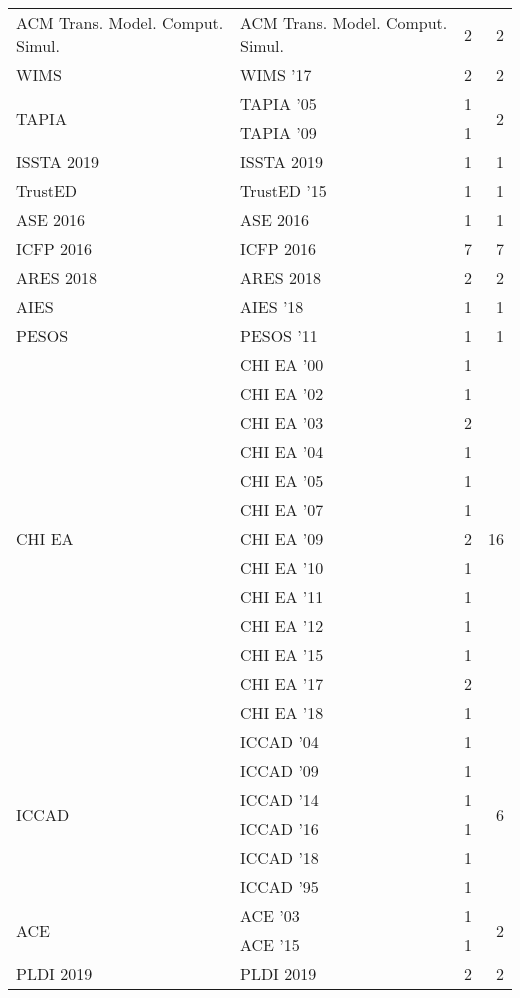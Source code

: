 \begin{table*}[t]
\begin{tabular}{llrr}
\multirow{1}{*}{ACM Trans. Model. Comput. Simul.} & ACM Trans. Model. Comput. Simul. & 2 & \multirow{1}{*}{2}\\
\multirow{1}{*}{WIMS } & WIMS '17 & 2 & \multirow{1}{*}{2}\\
\multirow{2}{*}{TAPIA } & TAPIA '05 & 1 & \multirow{2}{*}{2}\\
& TAPIA '09 & 1 &\\
\multirow{1}{*}{ISSTA 2019} & ISSTA 2019 & 1 & \multirow{1}{*}{1}\\
\multirow{1}{*}{TrustED } & TrustED '15 & 1 & \multirow{1}{*}{1}\\
\multirow{1}{*}{ASE 2016} & ASE 2016 & 1 & \multirow{1}{*}{1}\\
\multirow{1}{*}{ICFP 2016} & ICFP 2016 & 7 & \multirow{1}{*}{7}\\
\multirow{1}{*}{ARES 2018} & ARES 2018 & 2 & \multirow{1}{*}{2}\\
\multirow{1}{*}{AIES } & AIES '18 & 1 & \multirow{1}{*}{1}\\
\multirow{1}{*}{PESOS } & PESOS '11 & 1 & \multirow{1}{*}{1}\\
\multirow{13}{*}{CHI EA } & CHI EA '00 & 1 & \multirow{13}{*}{16}\\
& CHI EA '02 & 1 &\\
& CHI EA '03 & 2 &\\
& CHI EA '04 & 1 &\\
& CHI EA '05 & 1 &\\
& CHI EA '07 & 1 &\\
& CHI EA '09 & 2 &\\
& CHI EA '10 & 1 &\\
& CHI EA '11 & 1 &\\
& CHI EA '12 & 1 &\\
& CHI EA '15 & 1 &\\
& CHI EA '17 & 2 &\\
& CHI EA '18 & 1 &\\
\multirow{6}{*}{ICCAD } & ICCAD '04 & 1 & \multirow{6}{*}{6}\\
& ICCAD '09 & 1 &\\
& ICCAD '14 & 1 &\\
& ICCAD '16 & 1 &\\
& ICCAD '18 & 1 &\\
& ICCAD '95 & 1 &\\
\multirow{2}{*}{ACE } & ACE '03 & 1 & \multirow{2}{*}{2}\\
& ACE '15 & 1 &\\
\multirow{1}{*}{PLDI 2019} & PLDI 2019 & 2 & \multirow{1}{*}{2}\\

\end{tabular}
\end{table*}
